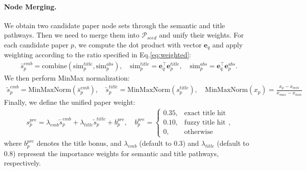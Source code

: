 \documentclass{llmxive}
\begin{document}
\paragraph{Node Merging.}
We obtain two candidate paper node sets through the semantic and title pathways.
Then we need to merge them into $\mathcal{P}_{seed}$ and unify their weights.
For each candidate paper $p$, we compute the dot product with vector $\mathbf{e}_q$ and apply weighting according to the ratio specified in Eq.\ref{eq:weighted}:
\begin{align}
    \bar{s}_p^{emb} = \text{combine}(\text{sim}_p^{title},\text{sim}_p^{abs}),\quad\text{sim}_p^{title} = \mathbf{e}_q^\top \mathbf{e}_p^{title},\quad\text{sim}_p^{abs} = \mathbf{e}_q^\top \mathbf{e}_p^{abs}.
\end{align}
We then perform MinMax normalization:
\begin{align}
    \widetilde{s}_p^{emb} = \text{MinMaxNorm}(\bar{s}_p^{emb}),\quad\widetilde{s}_p^{title} = \text{MinMaxNorm}(s_p^{title}),\quad\text{MinMaxNorm}(x_p) = \frac{x_p - x_{min}}{x_{max} - x_{min}}
\end{align}
Finally, we define the unified paper weight:
\begin{align}
    \label{eq:pre_graph}s_p^{pre}=\lambda_{emb}\widetilde{s}_p^{emb}+\lambda_{title}\widetilde{s}_p^{title}+b_p^{pre},\quad b_p^{pre} =
\begin{cases}
0.35, & \text{exact title hit} \\
0.10, & \text{fuzzy title hit} \\
0, & \text{otherwise}
\end{cases},
\end{align}
where $b_p^{pre}$ denotes the title bonus, and $\lambda_{emb}$ (default to $0.3$) and $\lambda_{title}$ (default to $0.8$) represent the importance weights for semantic and title pathways, respectively.
\end{document}
